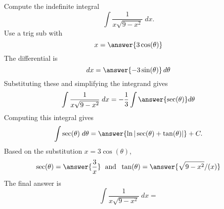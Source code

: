 \documentclass{ximera}
\begin{document}
\begin{problem}

Compute the indefinite integral
\[
\int \frac{1}{x\sqrt{9-x^2}}  \; dx.
\]
Use a trig sub with\\
\[
x = \answer{3\cos(\theta)}
\]
The differential is\\
\[
dx = \answer{-3\sin(\theta)}\,d\theta
\]
Substituting these and simplifying the integrand gives\\
\[
\int \frac{1}{x\sqrt{9-x^2}}  \; dx = -\frac13\int \answer{\sec(\theta)} d\theta
\]
Computing this integral gives
\[
\int \sec(\theta) \; d\theta = \answer{\ln|\sec(\theta) + \tan(\theta)|} + C.
\]
Based on the substitution $x = 3 \cos(\theta)$, \\
\[
\sec(\theta) = \answer{\frac{3}{x}} \; \text{ and } \; \tan(\theta) = \answer{\sqrt{9-x^2}/(x)}
\]
The final answer is
\[
\int  \frac{1}{x\sqrt{9-x^2}}  \; dx = 
\]
\begin{center}
\begin{multipleChoice}
\end{multipleChoice}
\end{center}

\end{problem}
\end{document}
